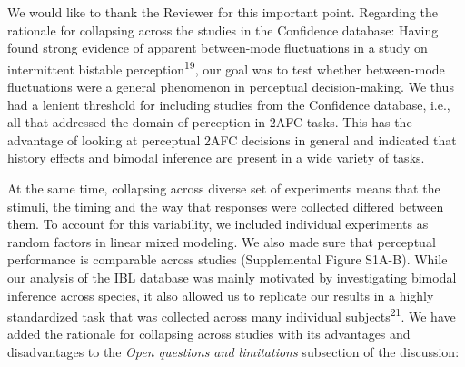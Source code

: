 \documentclass[
]{article}
\begin{document}
We would like to thank the Reviewer for this important point. Regarding
the rationale for collapsing across the studies in the Confidence
database: Having found strong evidence of apparent between-mode
fluctuations in a study on intermittent bistable
perception\textsuperscript{19}, our goal was to test whether
between-mode fluctuations were a general phenomenon in perceptual
decision-making. We thus had a lenient threshold for including studies
from the Confidence database, i.e., all that addressed the domain of
perception in 2AFC tasks. This has the advantage of looking at
perceptual 2AFC decisions in general and indicated that history effects
and bimodal inference are present in a wide variety of tasks.

At the same time, collapsing across diverse set of experiments means
that the stimuli, the timing and the way that responses were collected
differed between them. To account for this variability, we included
individual experiments as random factors in linear mixed modeling. We
also made sure that perceptual performance is comparable across studies
(Supplemental Figure S1A-B). While our analysis of the IBL database was
mainly motivated by investigating bimodal inference across species, it
also allowed us to replicate our results in a highly standardized task
that was collected across many individual subjects\textsuperscript{21}.
We have added the rationale for collapsing across studies with its
advantages and disadvantages to the \emph{Open questions and
limitations} subsection of the discussion:
\end{document}
